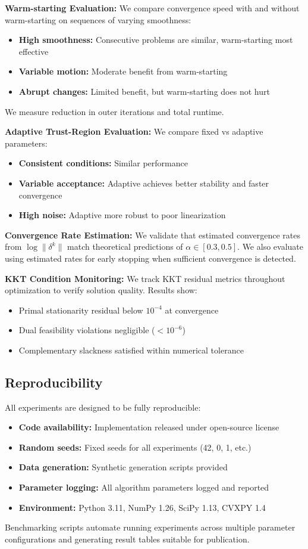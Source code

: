 \textbf{Warm-starting Evaluation:} We compare convergence speed with and without warm-starting on sequences of varying smoothness:
\begin{itemize}
\item \textbf{High smoothness:} Consecutive problems are similar, warm-starting most effective
\item \textbf{Variable motion:} Moderate benefit from warm-starting
\item \textbf{Abrupt changes:} Limited benefit, but warm-starting does not hurt
\end{itemize}

We measure reduction in outer iterations and total runtime.

\textbf{Adaptive Trust-Region Evaluation:} We compare fixed vs adaptive parameters:
\begin{itemize}
\item \textbf{Consistent conditions:} Similar performance
\item \textbf{Variable acceptance:} Adaptive achieves better stability and faster convergence
\item \textbf{High noise:} Adaptive more robust to poor linearization
\end{itemize}

\textbf{Convergence Rate Estimation:} We validate that estimated convergence rates from $\log \|\delta^k\|$ match theoretical predictions of $\alpha \in [0.3, 0.5]$. We also evaluate using estimated rates for early stopping when sufficient convergence is detected.

\textbf{KKT Condition Monitoring:} We track KKT residual metrics throughout optimization to verify solution quality. Results show:
\begin{itemize}
\item Primal stationarity residual below $10^{-4}$ at convergence
\item Dual feasibility violations negligible ($< 10^{-6}$)
\item Complementary slackness satisfied within numerical tolerance
\end{itemize}

\subsection{Reproducibility}

All experiments are designed to be fully reproducible:
\begin{itemize}
\item \textbf{Code availability:} Implementation released under open-source license
\item \textbf{Random seeds:} Fixed seeds for all experiments (42, 0, 1, etc.)
\item \textbf{Data generation:} Synthetic generation scripts provided
\item \textbf{Parameter logging:} All algorithm parameters logged and reported
\item \textbf{Environment:} Python 3.11, NumPy 1.26, SciPy 1.13, CVXPY 1.4
\end{itemize}

Benchmarking scripts automate running experiments across multiple parameter configurations and generating result tables suitable for publication.
